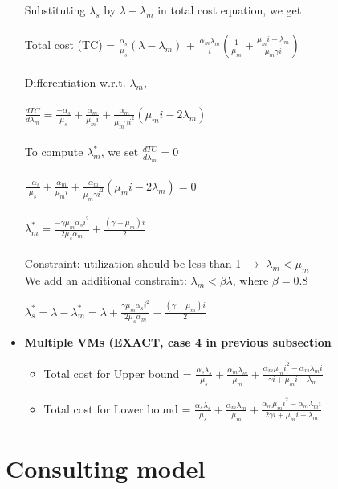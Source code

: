 \documentclass[letter,11pt]{article}
\begin{document}
\begin{itemize}
Substituting $\lambda_s$ by $\lambda - \lambda_m$ in total cost equation, we get\\ \\
Total cost (TC) = $\frac{\alpha_s}{\mu_s}(\lambda - \lambda_m)$ + $\frac{\alpha_m \lambda_m}{i} (\frac{1}{\mu_m} + \frac{\mu_m i - \lambda_m}{\mu_m \gamma i})$ \\ \\
Differentiation w.r.t. $\lambda_m$, \\ \\
$\frac{d TC}{d \lambda_m} = \frac{- \alpha_s}{\mu_s} + \frac{\alpha_m}{\mu_m i} + \frac{\alpha_m}{\mu_m \gamma i^2}(\mu_m i - 2 \lambda_m)$ \\ \\
To compute $\lambda_m^{*}$, we set $\frac{d TC}{d \lambda_m} = 0$ \\ \\
$\frac{- \alpha_s}{\mu_s} + \frac{\alpha_m}{\mu_m i} + \frac{\alpha_m}{\mu_m \gamma i^2}(\mu_m i - 2 \lambda_m) = 0$ \\ \\ 
$\lambda_m^{*} = \frac{- \gamma \mu_m \alpha_s i^2}{2 \mu_s \alpha_m} + \frac{(\gamma + \mu_m)i}{2}$ \\ \\
Constraint: utilization should be less than 1 $\rightarrow$ $\lambda_m < \mu_m$\\  
We add an additional constraint: $\lambda_m < \beta \lambda$, where $\beta = 0.8$

$\lambda_s^{*} = \lambda - \lambda_m^{*} = \lambda + \frac{\gamma \mu_m \alpha_s i^2}{2 \mu_s \alpha_m} - \frac{(\gamma + \mu_m)i}{2}$

\item \textbf{Multiple VMs (EXACT, case 4 in previous subsection}

\begin{itemize}
\item Total cost for Upper bound = $\frac{\alpha_s \lambda_s}{\mu_s} + \frac{\alpha_m \lambda_m}{\mu_m} + \frac{\alpha_m \mu_m i^2 - \alpha_m \lambda_m i}{\gamma i + \mu_m i - \lambda_m}$
\item Total cost for Lower bound = $\frac{\alpha_s \lambda_s}{\mu_s} + \frac{\alpha_m \lambda_m}{\mu_m} + \frac{\alpha_m \mu_m i^2 - \alpha_m \lambda_m i}{2 \gamma i + \mu_m i - \lambda_m}$
\end{itemize}

\end{itemize}

\section{Consulting model}
\end{document}
